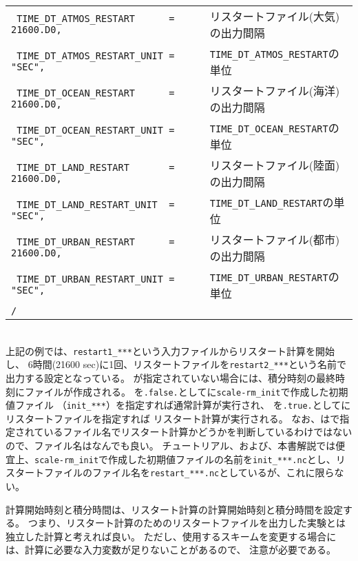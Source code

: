 {{{\begin{tabularx}{150mm}{lX}
\verb| TIME_DT_ATMOS_RESTART      = 21600.D0,             | & リスタートファイル(大気)の出力間隔\\
\verb| TIME_DT_ATMOS_RESTART_UNIT = "SEC",                | & \verb|TIME_DT_ATMOS_RESTART|の単位\\
\verb| TIME_DT_OCEAN_RESTART      = 21600.D0,             | & リスタートファイル(海洋)の出力間隔\\
\verb| TIME_DT_OCEAN_RESTART_UNIT = "SEC",                | & \verb|TIME_DT_OCEAN_RESTART|の単位\\
\verb| TIME_DT_LAND_RESTART       = 21600.D0,             | & リスタートファイル(陸面)の出力間隔\\
\verb| TIME_DT_LAND_RESTART_UNIT  = "SEC",                | & \verb|TIME_DT_LAND_RESTART|の単位\\
\verb| TIME_DT_URBAN_RESTART      = 21600.D0,             | & リスタートファイル(都市)の出力間隔\\
\verb| TIME_DT_URBAN_RESTART_UNIT = "SEC",                | & \verb|TIME_DT_URBAN_RESTART|の単位\\
\verb|/| & \\
\end{tabularx}
}}}\\


上記の例では、\verb|restart1_***|という入力ファイルからリスタート計算を開始し、
6時間(21600 sec)に1回、リスタートファイルを\verb|restart2_***|という名前で出力する設定となっている。
が指定されていない場合には、積分時刻の最終時刻にファイルが作成される。
を\verb|.false.|としてに\verb|scale-rm_init|で作成した初期値ファイル
（\verb|init_***|）を指定すれば通常計算が実行され、
を\verb|.true.|としてにリスタートファイルを指定すれば
リスタート計算が実行される。
なお、\scalerm はで指定されているファイル名でリスタート計算かどうかを判断しているわけではないので、ファイル名はなんでも良い。
チュートリアル、および、本書解説では便宜上、\verb|scale-rm_init|で作成した初期値ファイルの名前を\verb|init_***.nc|とし、リスタートファイルのファイル名を\verb|restart_***.nc|としているが、これに限らない。

計算開始時刻と積分時間は、リスタート計算の計算開始時刻と積分時間を設定する。
つまり、リスタート計算のためのリスタートファイルを出力した実験とは独立した計算と考えれば良い。
ただし、使用するスキームを変更する場合には、計算に必要な入力変数が足りないことがあるので、
注意が必要である。


